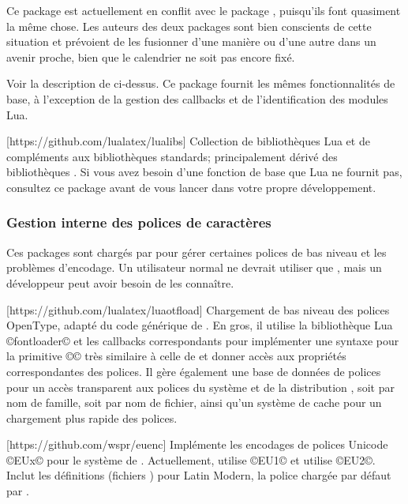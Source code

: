 \documentclass{lltxdoc}
\begin{document}
 Ce package est actuellement en conflit avec le package
, puisqu'ils font quasiment la même chose. Les auteurs des deux
packages sont bien conscients de cette situation et prévoient de les fusionner
d'une manière ou d'une autre dans un avenir proche, bien que le calendrier
ne soit pas encore fixé.

Voir la description de  ci-dessus. Ce package fournit les mêmes
fonctionnalités de base, à l'exception de la gestion des callbacks et de
l'identification des modules Lua.

[https://github.com/lualatex/lualibs]
Collection de bibliothèques Lua et de compléments aux bibliothèques standards;
principalement dérivé des bibliothèques \context. Si vous avez besoin
d'une fonction de base que Lua ne fournit pas, consultez ce package avant
de vous lancer dans votre propre développement.


\subsubsection{Gestion interne des polices de caractères}\label{fontint}

Ces packages sont chargés par  pour gérer certaines polices
de bas niveau et les problèmes d'encodage. Un utilisateur normal ne devrait
utiliser que , mais un développeur peut avoir besoin de les connaître.

[https://github.com/lualatex/luaotfload]
Chargement de bas niveau des polices OpenType, adapté du code générique de \context.
En gros, il utilise la bibliothèque Lua ©fontloader© et les callbacks correspondants
pour implémenter une syntaxe pour la primitive ©\font© très similaire à celle de \xetex
et donner accès aux propriétés correspondantes des polices. Il gère également une base
de données de polices pour un accès transparent aux polices du système et de la
distribution \tex, soit par nom de famille, soit par nom de fichier, ainsi qu'un
système de cache pour un chargement plus rapide des polices.

[https://github.com/wspr/euenc]
Implémente les encodages de polices Unicode ©EUx© pour le système 
de \latex. Actuellement, \xelatex utilise ©EU1© et \lualatex utilise ©EU2©.
Inclut les définitions (fichiers ) pour Latin Modern, la police
chargée par défaut par .
\end{document}
